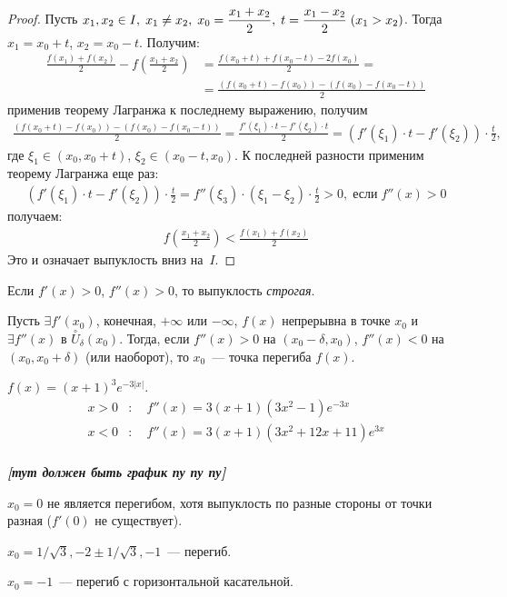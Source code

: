 \begin{proof}
Пусть \(\displaystyle x_1, x_2 \in I, \; x_1 \neq x_2, \; x_0 = \frac{x_1 + x_2}{2}, \; t = \frac{x_1-x_2}{2}
\; (x_1 > x_2)\). Тогда \(x_1 = x_0 + t\), \(x_2 = x_0 - t\). Получим:
\begin{align}
    \frac{f(x_1) + f(x_2)}{2} - f\left(\frac{x_1 + x_2}{2}\right) &= \frac{f(x_0 + t) + f(x_0 - t) -
        2f(x_0)}{2} =\\
    &= \frac{\left(f(x_0 + t) - f(x_0)\right) - \left(f(x_0) - f(x_0 - t)\right)}{2}
\end{align}
применив теорему Лагранжа к последнему выражению, получим
\begin{gather}
    \frac{\left(f(x_0 + t) - f(x_0)\right) - \left(f(x_0) - f(x_0 - t)\right)}{2} = \frac{f'(\xi_1)
        \cdot t - f'(\xi_2) \cdot t}{2} = \left(f'(\xi_1) \cdot t - f'(\xi_2)\right) \cdot
        \frac{t}{2},
\end{gather}
где \(\xi_1 \in (x_0, x_0 + t)\), \(\xi_2 \in (x_0 - t, x_0)\). К последней разности применим
теорему Лагранжа еще раз:
\begin{gather}
    \left(f'(\xi_1) \cdot t - f'(\xi_2)\right) \cdot \frac{t}{2} = f''(\xi_3) \cdot (\xi_1-\xi_2)
        \cdot \frac{t}{2} >0, \; \text{если} \; f''(x) > 0
\end{gather}
получаем:
\begin{gather}
    f\left(\frac{x_1 + x_2}{2}\right) < \frac{f(x_1) + f(x_2)}{2}
\end{gather}
Это и означает выпуклость вниз на~\(I\).
\end{proof}

\begin{note}
Если \(f'(x) > 0\), \(f''(x) > 0\), то выпуклость \textit{строгая}.
\end{note}

\begin{theorem}
Пусть \(\exists f'(x_0)\), конечная, \(+ \infty\) или \(- \infty\), \(f(x)\) непрерывна в точке
\(x_0\) и \(\exists f''(x)\) в \(\overset{\circ}{U}_{\delta} (x_0)\). Тогда, если \(f''(x) > 0\) на
\((x_0 - \delta, x_0)\), \(f''(x) < 0\) на \((x_0, x_0 + \delta)\) (или наоборот), то \(x_0\)~---
точка перегиба \(f(x)\).
\end{theorem}

\begin{example}
\(f(x) = (x + 1)^3e^{-3|x|}\).
\begin{align}
    x > 0&: \quad f''(x) = 3(x + 1)(3x^2 - 1)e^{-3x}\\
    x < 0&: \quad f''(x) = 3(x + 1)(3x^2 + 12x + 11)e^{3x}\\
\end{align}

\textbf{\textit{[тут должен быть график пу пу пу]}}

\(x_0 = 0\) не является перегибом, хотя выпуклость по разные стороны от точки разная (\(f'(0)\) не
существует).

\(x_0 = 1/\sqrt{3}, -2 \pm 1/\sqrt{3}, -1\)~--- перегиб.

\(x_0 = -1\)~--- перегиб с горизонтальной касательной.
\end{example}

